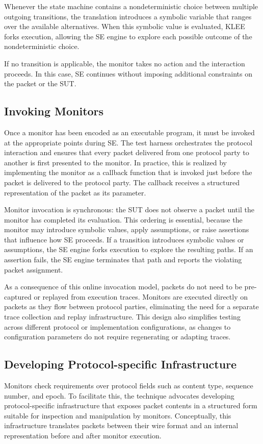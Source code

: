 Whenever the state machine contains a nondeterministic choice between multiple outgoing transitions, the translation introduces a symbolic variable that ranges over the available alternatives. 
When this symbolic value is evaluated, KLEE forks execution, allowing the SE engine to explore each possible outcome of the nondeterministic choice.

If no transition is applicable, the monitor takes no action and the interaction proceeds. 
In this case, SE continues without imposing additional constraints on the packet or the SUT.

\subsection{Invoking Monitors}
Once a monitor has been encoded as an executable program, it must be invoked at the appropriate points during SE.
The test harness orchestrates the protocol interaction and ensures that every packet delivered from one protocol party to another is first presented to the monitor.
In practice, this is realized by implementing the monitor as a callback function that is invoked just before the packet is delivered to the protocol party.
The callback receives a structured representation of the packet as its parameter.

Monitor invocation is synchronous: the SUT does not observe a packet until the monitor has completed its evaluation.
This ordering is essential, because the monitor may introduce symbolic values, apply assumptions, or raise assertions that influence how SE proceeds.
If a transition introduces symbolic values or assumptions, the SE engine forks execution to explore the resulting paths.
If an assertion fails, the SE engine terminates that path and reports the violating packet assignment.

As a consequence of this online invocation model, packets do not need to be pre-captured or replayed from execution traces.
Monitors are executed directly on packets as they flow between protocol parties, eliminating the need for a separate trace collection and replay infrastructure.
This design also simplifies testing across different protocol or implementation configurations, as changes to configuration parameters do not require regenerating or adapting traces.

\subsection{Developing Protocol-specific Infrastructure}
Monitors check requirements over protocol fields such as content type, sequence number, and epoch.
To facilitate this, the technique advocates developing protocol-specific infrastructure that exposes packet contents in a structured form suitable for inspection and manipulation by monitors.
Conceptually, this infrastructure translates packets between their wire format and an internal representation before and after monitor execution.

